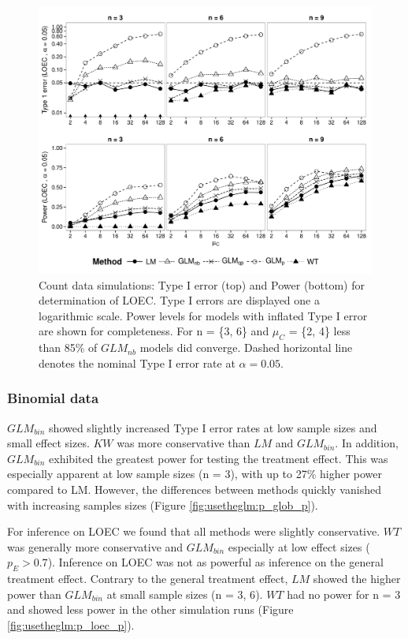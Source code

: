 \begin{landscape}
\begin{figure}
  \centering
  \includegraphics[width = 1.05\textwidth]{chapters/usetheglm/p_loec_c.pdf}
  \caption[Count data simulations: Type I error and Power for determination of LOEC.]{Count data simulations: Type I error (top) and Power (bottom) for determination of LOEC.
  Type I errors are displayed one a logarithmic scale.
  Power levels for models with inflated Type I error are shown for completeness.
  For n = \{3, 6\} and $\mu_C$ = \{2, 4\} less than 85\% of $GLM_{nb}$ models did converge.
  Dashed horizontal line denotes the nominal Type I error rate at $\alpha = 0.05$.
  }
  \label{fig:usetheglm:p_loec_c}
\end{figure}
\end{landscape}


\subsubsection{Binomial data}
$GLM_{bin}$ showed slightly increased Type I error rates at low sample sizes and small effect sizes.
$KW$ was more conservative than $LM$ and $GLM_{bin}$.
In addition, $GLM_{bin}$ exhibited the greatest power for testing the treatment effect. 
This was especially apparent at low sample sizes (n = 3), with up to 27\% higher power compared to LM.
However, the differences between methods quickly vanished with increasing samples sizes (Figure \ref{fig:usetheglm:p_glob_p}).

For inference on LOEC we found that all methods were slightly conservative.
$WT$ was generally more conservative and $GLM_{bin}$ especially at low effect sizes ($p_E > 0.7$).
Inference on LOEC was not as powerful as inference on the general treatment effect.
Contrary to the general treatment effect, $LM$ showed the higher power than $GLM_{bin}$ at small sample sizes (n = {3, 6}).
$WT$ had no power for n = 3 and showed less power in the other simulation runs (Figure \ref{fig:usetheglm:p_loec_p}).


